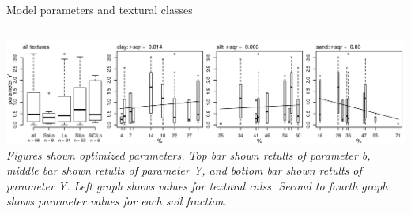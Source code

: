 \begin{block}{Model parameters and textural classes}
\begin{columns}
\begin{column}{0.8\textwidth}
        \includegraphics[width = \textwidth]{obr/Yfittex.png}
        {\it Figures shown optimized parameters. Top bar shown retults of parameter b, middle bar shown retults of parameter Y, and bottom bar shown retults of parameter Y. Left graph shows values for textural calss. Second to fourth graph shows parameter values for each soil fraction.}
    \end{column}
\end{columns} 

\end{block}

% 
